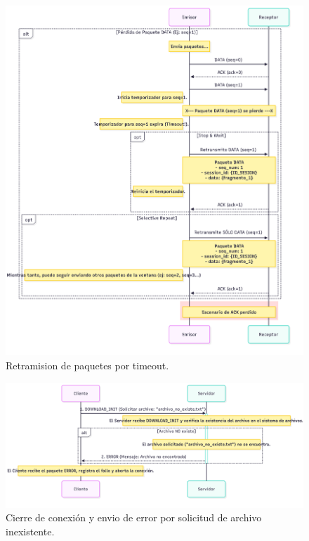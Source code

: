 \begin{figure}[H]
    \centering
    \includegraphics[width=1\linewidth]{images/RETRANSMISION}
    \caption{Retramision de paquetes por timeout.}
    \label{fig:retransmision}
\end{figure}

\begin{figure}[H]
    \centering
    \includegraphics[width=1\linewidth]{images/diagram_sec_unexistent_file.png}
    \caption{Cierre de conexión y envio de error por solicitud de archivo inexistente.}
    \label{fig:retransmision}
\end{figure}




